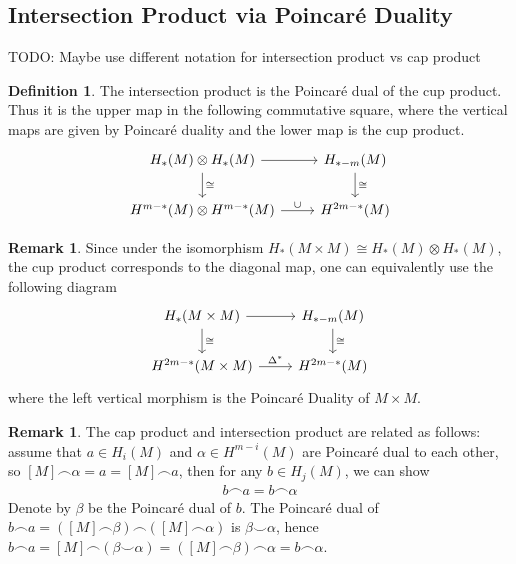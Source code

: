 \documentclass{scrartcl}
\theoremstyle{plain}
\theoremstyle{definition}
\newtheorem{definition}[theorem]{Definition}
\newtheorem{remark}[theorem]{Remark}
\newcommand{\capp}{\mathbin{\frown}}
\newcommand{\cupp}{\mathbin{\smile}}
\newcommand{\iso}{\cong}
\begin{document}
\subsection{Intersection Product via Poincaré Duality} \label{subsec:intersection_product_via_pd}

TODO: Maybe use different notation for intersection product vs cap product
\begin{definition}
The intersection product is the Poincaré dual of the cup product. Thus it is the upper map in the following commutative square, where the vertical maps are given by Poincaré duality and the lower map is the cup product.
\begin{equation}
    \begin{tikzcd}
        H_*(M) \otimes H_*(M) \dar["\iso"] \rar & H_{*-m}(M) \dar["\iso"] \\
        H^{m-*}(M)\otimes H^{m-*}(M) \rar["\cup"] &  H^{2m-*}(M)
    \end{tikzcd}
\end{equation}
\end{definition}
\begin{remark}
Since under the isomorphism $H_*(M\times M) \iso H_*(M)\otimes H_*(M)$, the cup product corresponds to the diagonal map, one can equivalently use the following diagram
\begin{equation}
    \begin{tikzcd}
        H_*(M\times M) \dar["\iso"] \rar & H_{*-m}(M) \dar["\iso"] \\
        H^{2m-*}(M\times M) \rar["\Delta^*"] & H^{2m-*}(M)
    \end{tikzcd}
\end{equation}
where the left vertical morphism is the Poincaré Duality of $M\times M$.
\end{remark}

\begin{remark}
The cap product and intersection product are related as follows: assume that $a\in H_i(M)$ and $\alpha\in H^{m-i}(M)$ are Poincaré dual to each other, so $[M]\capp \alpha = a = [M]\capp a$, then for any $b\in H_j(M)$, we can show 
\begin{align*}
    b\capp a = b\capp \alpha 
\end{align*}
Denote by $\beta$ be the Poincaré dual of $b$. The Poincaré dual of  $b\capp a = ([M]\capp \beta) \capp ([M] \capp\alpha)$ is $\beta\cupp\alpha$, hence $b\capp a = [M] \capp (\beta\cupp \alpha) = ([M]\capp \beta) \capp \alpha =  b\capp \alpha$.
\end{remark}
\end{document}
